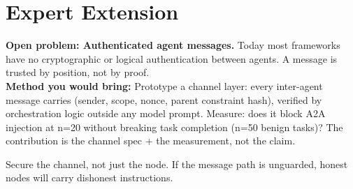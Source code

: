 \section{Expert Extension}
\rbadge
\textbf{Open problem: Authenticated agent messages.} Today most frameworks have no cryptographic or logical authentication between agents. A message is trusted by position, not by proof.\\
\textbf{Method you would bring:} Prototype a channel layer: every inter-agent message carries (sender, scope, nonce, parent constraint hash), verified by orchestration logic outside any model prompt. Measure: does it block A2A injection at n=20 without breaking task completion (n=50 benign tasks)? The contribution is the channel spec + the measurement, not the claim.

\begin{checkbox}
Secure the channel, not just the node. If the message path is unguarded, honest nodes will carry dishonest instructions.
\end{checkbox}

